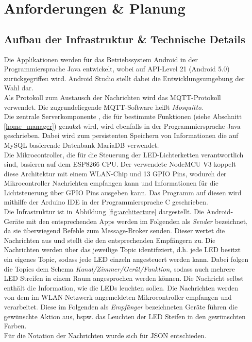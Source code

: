 \chapter{Anforderungen \& Planung}

\section{Aufbau der Infrastruktur \& Technische Details}

Die Applikationen werden für das Betriebssystem Android in der Programmiersprache Java entwickelt, wobei auf API-Level 21 (Android 5.0) zurückgegriffen wird. Android Studio stellt dabei die Entwicklungsumgebung der Wahl dar. \\
Als Protokoll zum Austausch der Nachrichten wird das MQTT-Protokoll verwendet. Die zugrundeliegende MQTT-Software heißt \textit{Mosquitto}. \\
Die zentrale Serverkomponente , die für bestimmte Funktionen (siehe Abschnitt \ref{home_manager}) genutzt wird, wird ebenfalls in der Programmiersprache Java geschrieben. Dabei wird zum persistenten Speichern von Informationen die auf MySQL basierende Datenbank MariaDB verwendet. \\
Die Mikrocontroller, die für die Steuerung der LED-Lichterketten verantwortlich sind, basieren auf dem ESP8266 CPU. Der verwendete NodeMCU V3 koppelt diese Architektur mit einem WLAN-Chip und 13 GPIO Pins, wodurch der Mikrocontroller Nachrichten empfangen kann und Informationen für die Lichtsteuerung über GPIO Pins ausgeben kann. Das Programm auf diesen wird mithilfe der Arduino IDE in der Programmiersprache C geschrieben. \\ 
Die Infrastruktur ist in Abbildung \ref{fig:architecture} dargestellt. Die Android-Geräte mit den entsprechenden Apps werden im Folgenden als \textit{Sender} bezeichnet, da sie überwiegend Befehle zum Message-Broker senden. Dieser wertet die Nachrichten aus und stellt die den entsprechenden Empfängern zu. Die Nachrichten werden über das jeweilige Topic identifiziert, d.h. jede LED besitzt ein eigenes Topic, sodass jede LED einzeln angesteuert werden kann. Dabei folgen die Topics dem Schema \textit{Kanal/Zimmer/Gerät/Funktion}, sodass auch mehrere LED Streifen in einem Raum angesprochen werden können. Die Nachricht selbst enthält die Information, wie die LEDs leuchten sollen. Die Nachrichten werden von dem im WLAN-Netzwerk angemeldeten Mikrocontroller empfangen und verarbeitet. Diese im Folgenden als \textit{Empfänger} bezeichneten Geräte führen die gewünschte Aktion aus, bspw. das Leuchten der LED Steifen in den gewünschten Farben. \\
Für die Notation der Nachrichten wurde sich für JSON entschieden. 


